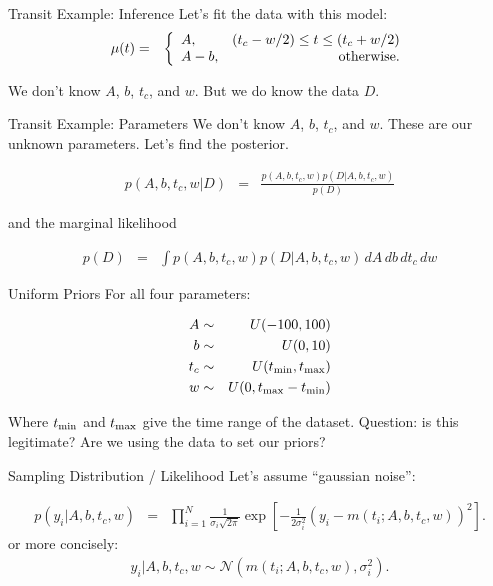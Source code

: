 \documentclass{beamer}
\begin{document}
\begin{frame}[fragile, t]{Transit Example: Inference}
Let's fit the data with this model:
\begin{eqnarray*}
\mu(t) &=& \left\{
\begin{array}{lr}
A, & (t_c - w/2) \leq t \leq (t_c + w/2)\\
A-b,  & \textnormal{otherwise}.
\end{array}
\right.
\end{eqnarray*}

We don't know $A$, $b$, $t_c$, and $w$. But we do know the data $D$.
\end{frame}



\begin{frame}[fragile, t]{Transit Example: Parameters}
We don't know $A$, $b$, $t_c$, and $w$.
These are our unknown parameters. Let's find the posterior.

\begin{eqnarray*}
p(A, b, t_c, w | D) &=& \frac{p(A, b, t_c, w)p(D | A, b, t_c, w)}{p(D)}
\end{eqnarray*}

and the marginal likelihood

\begin{eqnarray*}
p(D) &=& \int p(A, b, t_c, w)p(D | A, b, t_c, w) \, dA \, db \, dt_c \, dw
\end{eqnarray*}

\end{frame}

\begin{frame}[t]{Uniform Priors}
For all four parameters:

\begin{eqnarray*}
A &\sim& U(-100, 100)\\
b &\sim& U(0, 10)\\
t_c &\sim& U(t_{\rm min}, t_{\rm max})\\
w &\sim& U(0, t_{\rm max} - t_{\rm min})
\end{eqnarray*}

Where $t_{\rm min}$ and $t_{\rm max}$ give the time range of the dataset.
Question: is this legitimate? Are we using the data to set our priors?

\end{frame}


\begin{frame}[t]{Sampling Distribution / Likelihood}
Let's assume ``gaussian noise'':

\begin{eqnarray*}
p(y_i | A, b, t_c, w) &=& \prod_{i=1}^N \frac{1}{\sigma_i\sqrt{2\pi}}
\exp\left[
-\frac{1}{2\sigma_i^2}\left(y_i - m(t_i; A, b, t_c, w)\right)^2
\right].
\end{eqnarray*}
or more concisely:
\begin{eqnarray*}
y_i | A, b, t_c, w \sim \mathcal{N}\left(m(t_i; A, b, t_c, w), \sigma_i^2\right).
\end{eqnarray*}

\end{frame}
\end{document}

